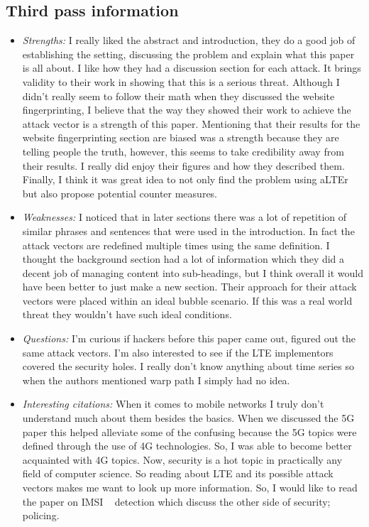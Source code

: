 \documentclass[letterpaper,twocolumn,10pt]{article}
\begin{document}
\subsection{Third pass information}
\label{sec:third}
\begin{itemize}

\item {\it Strengths:} 
I really liked the abstract and introduction, they do a good job of establishing the setting, discussing the problem
and explain what this paper is all about. I like how they had a discussion section for each attack. It brings validity
to their work in showing that this is a serious threat. Although I didn't really seem to follow their math when they 
discussed the website fingerprinting, I believe that the way they showed their work to achieve the attack vector
is a strength of this paper. Mentioning that their results for the website fingerprinting section are biased was a 
strength because they are telling people the truth, however, this seems to take credibility away from their 
results. I really did enjoy their figures and how they described them. Finally, I think it was great idea to not
only find the problem using aLTEr but also propose potential counter measures. 

\item {\it Weaknesses:} 
I noticed that in later sections there was a lot of repetition of similar phrases and sentences that were used in 
the introduction. In fact the attack vectors are redefined multiple times using the same definition. I thought the 
background section had a lot of information which they did a decent job of managing content into sub-headings, but 
I think overall it would have been better to just make a new section. Their approach for their attack vectors
were placed within an ideal bubble scenario. If this was a real world threat they wouldn't have such ideal conditions. 

\item {\it Questions:} 
I'm curious if hackers before this paper came out, figured out the same attack vectors. I'm also interested to 
see if the LTE implementors covered the security holes. I really don't know anything about time series so when
the authors mentioned warp path I simply had no idea. 

\item {\it Interesting citations:} 
When it comes to mobile networks I truly don't understand much about them besides the basics. When we 
discussed the 5G~\cite{5gwhite} paper this helped alleviate some of the confusing because the 5G topics 
were defined through the use of 4G technologies. So, I was able to become better acquainted with 4G topics. 
Now, security is a hot topic in practically any field of computer science. So reading about LTE and its possible
attack vectors makes me want to look up more information. So, I would like to read the paper on IMSI
~\cite{seaglass} detection which discuss the other side of security; policing.


\end{itemize}
\end{document}
